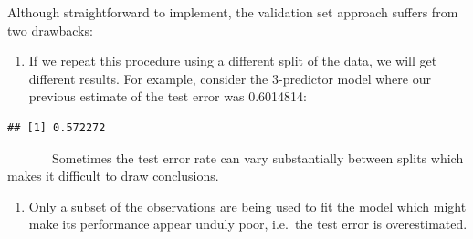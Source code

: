 \documentclass[
]{article}
\newenvironment{Shaded}{\begin{snugshade}}{\end{snugshade}}
\newcommand{\AttributeTok}[1]{\textcolor[rgb]{0.13,0.29,0.53}{#1}}
\newcommand{\ConstantTok}[1]{\textcolor[rgb]{0.56,0.35,0.01}{#1}}
\newcommand{\DecValTok}[1]{\textcolor[rgb]{0.00,0.00,0.81}{#1}}
\newcommand{\DocumentationTok}[1]{\textcolor[rgb]{0.56,0.35,0.01}{\textbf{\textit{#1}}}}
\newcommand{\FunctionTok}[1]{\textcolor[rgb]{0.13,0.29,0.53}{\textbf{#1}}}
\newcommand{\NormalTok}[1]{#1}
\newcommand{\OtherTok}[1]{\textcolor[rgb]{0.56,0.35,0.01}{#1}}
\newcommand{\SpecialCharTok}[1]{\textcolor[rgb]{0.81,0.36,0.00}{\textbf{#1}}}
\providecommand{\tightlist}{%
  \setlength{\itemsep}{0pt}\setlength{\parskip}{0pt}}
\begin{document}
Although straightforward to implement, the validation set approach
suffers from two drawbacks:

\begin{enumerate}
\def\labelenumi{\arabic{enumi}.}
\tightlist
\item
  If we repeat this procedure using a different split of the data, we
  will get different results. For example, consider the 3-predictor
  model where our previous estimate of the test error was 0.6014814:
\end{enumerate}

\begin{Shaded}
\end{Shaded}

\begin{verbatim}
## [1] 0.572272
\end{verbatim}

~~~~~~~Sometimes the test error rate can vary substantially between
splits which makes it difficult to draw conclusions.

\begin{enumerate}
\def\labelenumi{\arabic{enumi}.}
\setcounter{enumi}{1}
\tightlist
\item
  Only a subset of the observations are being used to fit the model
  which might make its performance appear unduly poor, i.e.~the test
  error is overestimated.
\end{enumerate}
\end{document}

